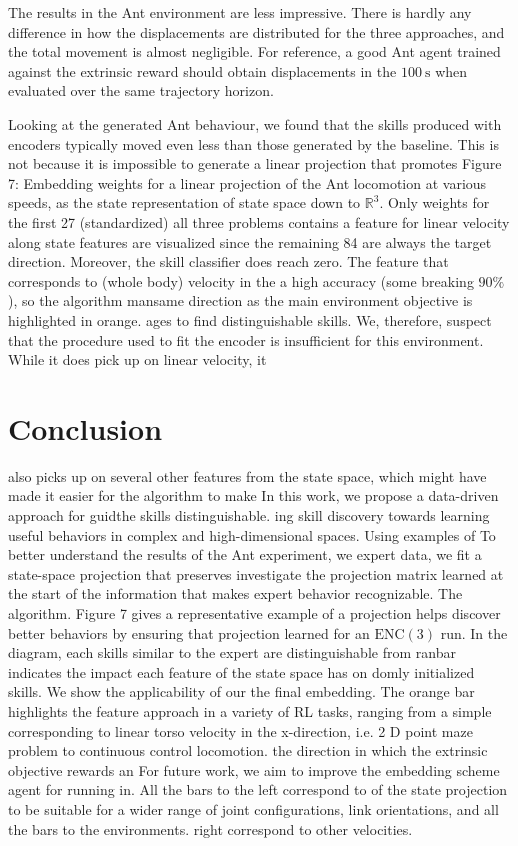 The results in the Ant environment are less impressive. There is hardly any difference in how the displacements are distributed for the three approaches, and the total movement is almost negligible. For reference, a good Ant agent trained against the extrinsic reward should obtain displacements in the $100 \mathrm{~s}$ when evaluated over the same trajectory horizon.

Looking at the generated Ant behaviour, we found that the skills produced with encoders typically moved even less than those generated by the baseline. This is not because it
is impossible to generate a linear projection that promotes Figure 7: Embedding weights for a linear projection of the Ant locomotion at various speeds, as the state representation of state space down to $\mathbb{R}^{3}$. Only weights for the first 27 (standardized) all three problems contains a feature for linear velocity along state features are visualized since the remaining 84 are always the target direction. Moreover, the skill classifier does reach zero. The feature that corresponds to (whole body) velocity in the a high accuracy (some breaking $90 \%$ ), so the algorithm mansame direction as the main environment objective is highlighted in orange. ages to find distinguishable skills. We, therefore, suspect that the procedure used to fit the encoder is insufficient for this environment. While it does pick up on linear velocity, it

\section{Conclusion} also picks up on several other features from the state space, which might have made it easier for the algorithm to make In this work, we propose a data-driven approach for guidthe skills distinguishable. ing skill discovery towards learning useful behaviors in complex and high-dimensional spaces. Using examples of To better understand the results of the Ant experiment, we expert data, we fit a state-space projection that preserves investigate the projection matrix learned at the start of the information that makes expert behavior recognizable. The algorithm. Figure 7 gives a representative example of a projection helps discover better behaviors by ensuring that projection learned for an $\mathrm{ENC}(3)$ run. In the diagram, each skills similar to the expert are distinguishable from ranbar indicates the impact each feature of the state space has on domly initialized skills. We show the applicability of our the final embedding. The orange bar highlights the feature approach in a variety of RL tasks, ranging from a simple corresponding to linear torso velocity in the x-direction, i.e. 2 D point maze problem to continuous control locomotion. the direction in which the extrinsic objective rewards an For future work, we aim to improve the embedding scheme agent for running in. All the bars to the left correspond to of the state projection to be suitable for a wider range of joint configurations, link orientations, and all the bars to the environments. right correspond to other velocities.

